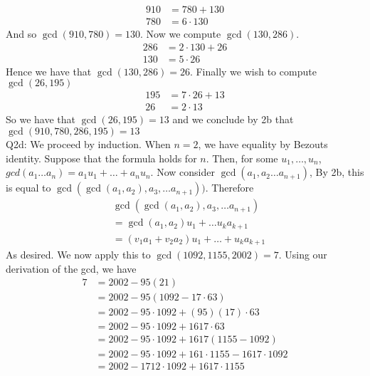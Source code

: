 \documentclass[letterpaper]{article}
\begin{document}
\begin{align*}
    910 & = 780+130
    \\ 780 &= 6\cdot 130
\end{align*} And so $\gcd(910,780)=130$. Now we compute $\gcd(130,286)$. 
\begin{align*}
    286 & = 2\cdot 130 + 26
    \\ 130 & = 5\cdot 26
\end{align*} Hence we have that $\gcd(130,286) = 26$. Finally we wish to compute $\gcd(26,195)$
\begin{align*}
    195 &= 7\cdot 26+ 13
   \\ 26 & = 2\cdot 13
\end{align*} 
So we have that $\gcd(26,195) = 13$ and we conclude by 2b that $\gcd(910,780,286,195) = 13$
\newline \\ Q2d: We proceed by induction. When $n=2$, we have equality by Bezouts identity. Suppose that the formula holds for $n$. Then, for some $u_1,\dots, u_n$, $gcd(a_1\dots a_n) = a_1 u_1 + \dots + a_n u_n$. 
Now consider $\gcd(a_1,a_2\dots a_{n+1})$, By 2b, this is equal to $\gcd(\gcd(a_1,a_2),a_3,\dots a_{n+1}))$. Therefore 
\begin{align*}
    & \gcd(\gcd(a_1,a_2),a_3 ,\dots a_{n+1})
    \\ & = \gcd(a_1,a_2) u_1 + \dots u_k a_{k+1}  \tag{by induction hypothesis}
    \\ & = (v_1a_1+v_2a_2)u_1  + \dots + u_k a_{k+1} \tag{by bezouts identity}
\end{align*} As desired. We now apply this to $\gcd(1092,1155,2002)=7$. Using our derivation of the gcd, we have 
\begin{align*}
    7 &  = 2002 - 95(21)
    \\ & = 2002-95(1092-17\cdot 63)
    \\ & = 2002-95\cdot 1092 + (95)(17)\cdot 63
    \\ & = 2002-95\cdot 1092 + 1617\cdot 63
    \\ & = 2002-95\cdot 1092 + 1617(1155-1092)
    \\ & = 2002-95 \cdot 1092 + 161\cdot 1155 - 1617\cdot 1092
    \\ & = 2002 - 1712\cdot 1092 + 1617 \cdot 1155
\end{align*}
\end{document}
